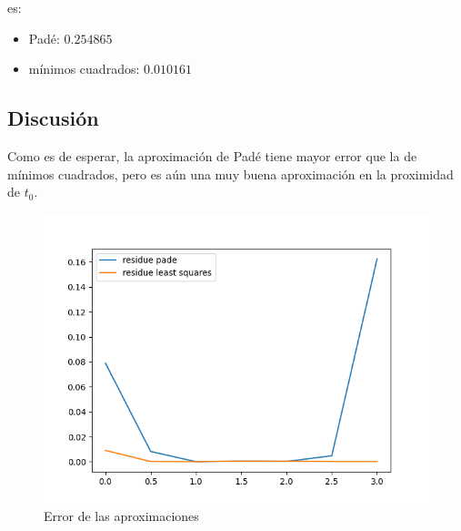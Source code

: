 es:
\begin{itemize}
	\item Padé: $0.254865$
	\item mínimos cuadrados: $0.010161$	
\end{itemize}

\subsection{Discusión}

Como es de esperar, la aproximación de Padé tiene mayor error que la de mínimos cuadrados, pero es aún una muy buena aproximación en la proximidad de $t_0$.

\begin{figure}[H]
	\includegraphics[width=\linewidth]{figures/errores_quad_approx.png}
	\caption{Error de las aproximaciones}
	\label{fig:error_quad_approx}
\end{figure}